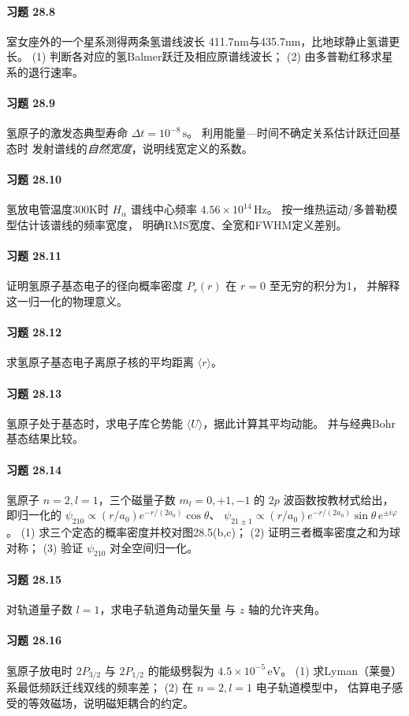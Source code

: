 \paragraph{习题 28.8}
室女座外的一个星系测得两条氢谱线波长
411.7nm与435.7nm，比地球静止氢谱更长。
(1) 判断各对应的氢Balmer跃迁及相应原谱线波长；
(2) 由多普勒红移求星系的退行速率。
\paragraph{习题 28.9}
氢原子的激发态典型寿命
\(\Delta t=10^{-8}\,\mathrm s\)。
利用能量—时间不确定关系估计跃迁回基态时
发射谱线的\emph{自然宽度}，说明线宽定义的系数。
\paragraph{习题 28.10}
氢放电管温度300K时 \(H_\alpha\) 谱线中心频率
\(4.56\times10^{14}\,\mathrm{Hz}\)。
按一维热运动/多普勒模型估计该谱线的频率宽度，
明确RMS宽度、全宽和FWHM定义差别。
\paragraph{习题 28.11}
证明氢原子基态电子的径向概率密度
\(P_r(r)\) 在 \(r=0\) 至无穷的积分为1，
并解释这一归一化的物理意义。
\paragraph{习题 28.12}
求氢原子基态电子离原子核的平均距离
\(\langle r\rangle\)。
\paragraph{习题 28.13}
氢原子处于基态时，求电子库仑势能
\(\langle U\rangle\)，据此计算其平均动能。
并与经典Bohr基态结果比较。
\paragraph{习题 28.14}
氢原子 \(n=2,l=1\)，三个磁量子数
\(m_l=0,+1,-1\) 的 \(2p\) 波函数按教材式给出，
即归一化的
\(\psi_{210}\propto(r/a_0)e^{-r/(2a_0)}\cos\theta\)、
\(\psi_{21\pm1}\propto(r/a_0)e^{-r/(2a_0)}
\sin\theta\,e^{\pm i\varphi}\)。
(1) 求三个定态的概率密度并校对图28.5(b,c)；
(2) 证明三者概率密度之和为球对称；
(3) 验证 \(\psi_{210}\) 对全空间归一化。
\paragraph{习题 28.15}
对轨道量子数 \(l=1\)，求电子轨道角动量矢量
与 \(z\) 轴的允许夹角。
\paragraph{习题 28.16}
氢原子放电时 \(2P_{3/2}\) 与 \(2P_{1/2}\)
的能级劈裂为 \(4.5\times10^{-5}\,\mathrm{eV}\)。
(1) 求Lyman（莱曼）系最低频跃迁线双线的频率差；
(2) 在 \(n=2,l=1\) 电子轨道模型中，
估算电子感受的等效磁场，说明磁矩耦合的约定。
